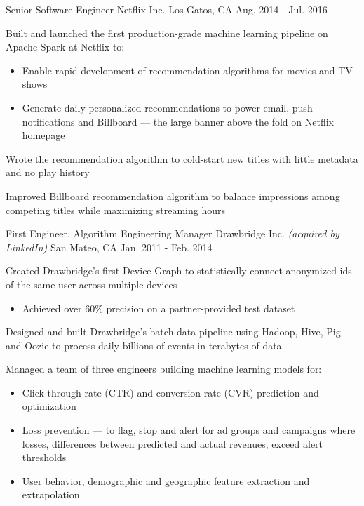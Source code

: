 \begin{cventries}
  \cventry
  {Senior Software Engineer} %
  {Netflix Inc.} %
  {Los Gatos, CA} %
  {Aug. 2014 - Jul. 2016} %
  {
    \begin{cvitems} %
      \item{Built and launched the first production-grade machine learning pipeline on Apache Spark at Netflix to:}
      \begin{itemize}[label=$\circ$]
        \item{Enable rapid development of recommendation algorithms for movies and TV shows}
        \item{Generate daily personalized recommendations to power email, push notifications and Billboard --- the large banner above the fold on Netflix homepage}
      \end{itemize}
      \item{Wrote the recommendation algorithm to cold-start new titles with little metadata and no play history}
      \item{Improved Billboard recommendation algorithm to balance impressions among competing titles while maximizing streaming hours}
    \end{cvitems}
  }

  \cventry
  {First Engineer, Algorithm Engineering Manager} %
  {Drawbridge Inc. \bodyfontlight\emph{(acquired by LinkedIn)}} %
  {San Mateo, CA} %
  {Jan. 2011 - Feb. 2014} %
  {
    \begin{cvitems} %
      \item{Created Drawbridge's first Device Graph to statistically connect anonymized ids of the same user across multiple devices}
      \begin{itemize}[label=$\circ$]
        \item{Achieved over 60\% precision on a partner-provided test dataset}
      \end{itemize}
      \item{Designed and built Drawbridge’s batch data pipeline using Hadoop, Hive, Pig and Oozie to process daily billions of events in terabytes of data}
      \item{Managed a team of three engineers building machine learning models for:}
      \begin{itemize}[label=$\circ$]
        \item{Click-through rate (CTR) and conversion rate (CVR) prediction and optimization}
        \item{Loss prevention --- to flag, stop and alert for ad groups and campaigns where losses, differences between predicted and actual revenues, exceed alert thresholds}
        \item{User behavior, demographic and geographic feature extraction and extrapolation}
      \end{itemize}
    \end{cvitems}
  }


\end{cventries}
